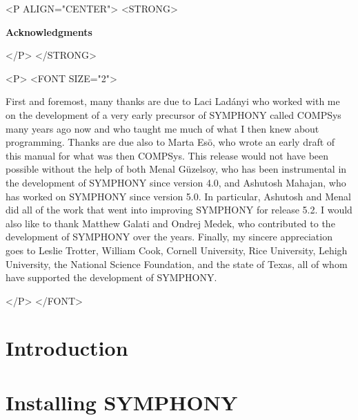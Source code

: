 \documentclass[twoside,11pt]{book}
\begin{document}
\newpage

\thispagestyle{empty}

\vspace*{1in}
\begin{rawhtml} <P ALIGN="CENTER"> <STRONG> 
\end{rawhtml}
\begin{center}
\textbf{\large Acknowledgments}
\end{center}
\begin{rawhtml} </P> </STRONG> 
\end{rawhtml}
\begin{rawhtml} <P> <FONT SIZE="2"> 
\end{rawhtml}
First and foremost, many thanks are due to Laci Lad\'anyi who worked with me
on the development of a very early precursor of SYMPHONY called COMPSys many
years ago now and who taught me much of what I then knew about programming.
Thanks are due also to Marta Es\"o, who wrote an early draft of this manual
for what was then COMPSys. This release would not have been possible without
the help of both Menal G\"uzelsoy, who has been instrumental in the
development of SYMPHONY since version 4.0, and Ashutosh Mahajan, who has
worked on SYMPHONY since version 5.0. In particular, Ashutosh and Menal did
all of the work that went into improving SYMPHONY for release 5.2. I would
also like to thank Matthew Galati and Ondrej Medek, who contributed to the
development of SYMPHONY over the years. Finally, my sincere appreciation goes
to Leslie Trotter, William Cook, Cornell University, Rice University, Lehigh
University, the National Science Foundation, and the state of Texas, all of
whom have supported the development of SYMPHONY.
\begin{rawhtml} </P> </FONT> 
\end{rawhtml}

\newpage

\thispagestyle{empty}

\newpage

\tableofcontents

\newpage

\mainmatter


\chapter{Introduction}


\chapter{Installing SYMPHONY}
\label{getting_started}

\end{document}

